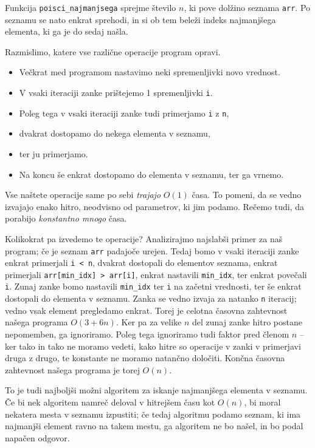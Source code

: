 \documentclass{article}
\begin{document}
Funkcija \verb+poisci_najmanjsega+ sprejme število \(n\), ki pove dolžino seznama
\verb+arr+. Po seznamu se nato enkrat sprehodi, in si ob tem beleži indeks
najmanjšega elementa, ki ga je do sedaj našla.

Razmislimo, katere vse različne operacije program opravi.
\begin{itemize}
  \item 
	Večkrat med programom nastavimo neki spremenljivki novo vrednost.
  \item
	V vsaki iteraciji zanke prištejemo 1 spremenljivki \verb+i+.
  \item
	Poleg tega v vsaki iteraciji zanke tudi primerjamo \verb+i+ z \verb+n+,
  \item
	dvakrat dostopamo do nekega elementa v seznamu,
  \item
	ter ju primerjamo.
  \item
	Na koncu še enkrat dostopamo do elementa v seznamu, ter ga vrnemo.
\end{itemize}

Vse naštete operacije same po sebi \emph{trajajo} \(O(1)\) časa. To pomeni, da
se vedno izvajajo enako hitro, neodvisno od parametrov, ki jim podamo. Rečemo
tudi, da porabijo \emph{konstantno mnogo} časa.

Kolikokrat pa izvedemo te operacije? Analizirajmo najslabši primer za naš
program; če je seznam \verb+arr+ padajoče urejen. Tedaj bomo v vsaki iteraciji
zanke enkrat primerjali \verb+i < n+, dvakrat dostopali do elementov seznama,
enkrat primerjali \verb+arr[min_idx] > arr[i]+, enkrat nastavili \verb+min_idx+,
ter enkrat povečali \verb+i+. Zunaj zanke bomo nastavili \verb+min_idx+ ter
\verb+i+ na začetni vrednosti, ter še enkrat dostopali do elementa v seznamu.
Zanka se vedno izvaja za natanko \verb+n+ iteracij; vedno vsak element pregledamo
enkrat. Torej je celotna časovna zahtevnost našega programa \(O(3 + 6n)\).
Ker pa za velike \(n\) del zunaj zanke hitro postane nepomemben, ga ignoriramo.
Poleg tega ignoriramo tudi faktor pred členom \(n\) -- ker tako in tako ne moramo
vedeti, kako hitre so operacije v zanki v primerjavi druga z drugo, te konstante
ne moramo natančno določiti. Končna časovna zahtevnost našega programa je torej
\(O(n)\).

To je tudi najboljši možni algoritem za iskanje najmanjšega elementa v seznamu.
Če bi nek algoritem namreč deloval v hitrejšem času kot \(O(n)\), bi moral
nekatera mesta v seznamu izpustiti; če tedaj algoritmu podamo seznam, ki ima
najmanjši element ravno na takem mestu, ga algoritem ne bo našel, in bo podal
napačen odgovor.
\end{document}
